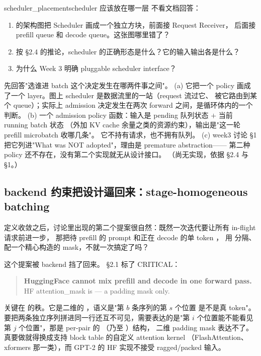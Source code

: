 \begin{checkpoint}{scheduler_placement}{scheduler 应该放在哪一层}
不看文档回答：
\begin{enumerate}[label=(\alph*)]
  \item {} 的架构图把 Scheduler 画成一个独立方块，前面接 Request Receiver，
        后面接 prefill queue 和 decode queue。这张图哪里错了？
  \item 按 §2.4 的推论，scheduler 的正确形态是什么？它的输入输出各是什么？
  \item 为什么 Week 3 明确 pluggable scheduler interface？
\end{enumerate}
\hint 先回答"选谁进 batch 这个决定发生在哪两件事之间"。
\ifshowanswers
\tcblower
\answer (a) 它把一个 policy 画成了一个 layer。图上 scheduler 是数据流里的一站（request 流过它、
被它路由到某个 queue）；实际上 admission 决定发生在两次 forward 之间，是循环体内的一个判断。
(b) 一个 admission policy 函数：输入是 pending 队列状态 $+$ 当前 running batch 状态
（外加 KV cache 余量之类的资源约束），输出是"这一轮 prefill microbatch 收哪几条"。
它不持有请求，也不拥有队列。
(c) week3 讨论 §1 把它列进"What was NOT adopted"，理由是 premature abstraction——
第二种 policy 还不存在，没有第二个实现就无从设计接口。
\whereincode （尚无实现，依据  §2.4 与
 §1。）
\fi
\end{checkpoint}

\subsection{backend 约束把设计逼回来：stage-homogeneous batching}
\label{sec:cb-stage}

定义收敛之后，讨论里出现的第二个提案很自然：既然一次迭代要让所有 in-flight 请求前进一步，
那把待 prefill 的 prompt 和正在 decode 的单 token ，
用  分隔、配一个精心构造的 mask，不就一次搞定了吗？

这个提案被 backend 挡了回来。 §2.1 标了 CRITICAL：

\begin{quote}
\textbf{HuggingFace  cannot mix prefill and decode in one forward pass.}
HF attention\_mask is  — a padding mask only.
\end{quote}

关键在  的秩。它是二维的 \code{[B, S]}，语义是"第 $b$ 条序列的第 $s$ 个位置
是不是真 token"。要把两条独立序列拼进同一行还互不可见，需要表达的是"第 $i$ 个位置能不能看见
第 $j$ 个位置"，那是 per-pair 的 \code{[S, S]}（乃至 \code{[B, 1, S, S]}）结构，
二维 padding mask 表达不了。真要做就得换成支持 block table 的自定义 attention kernel
（FlashAttention、xformers 那一类），而 GPT-2 的 HF 实现不接受 ragged/packed 输入。

